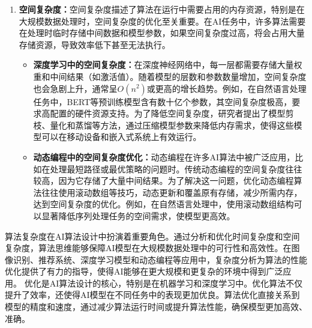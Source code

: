 \begin{enumerate}
\begin{itemize}
\item {\bf 推荐系统中的时间复杂度：}推荐系统在处理用户和商品数据的海量组合时，常面临计算复杂度的挑战。
例如，协同过滤算法在传统情况下计算复杂度较高，需要遍历大量数据。随着数据量增大，计算的时间复杂度可能达到$O(n^2)$或更高，使得推荐系统的实时计算难以实现。为此，一些优化方法，如矩阵分解和基于图的推荐算法，在复杂度控制上做出了优化，使得算法可以在大型电商平台和社交媒体中提供实时推荐。
\item {\bf 大规模搜索算法：}搜索问题是经典的AI任务，比如导航系统的路径规划。传统的广度优先搜索（BFS）和深度优先搜索（DFS）在复杂度上表现不佳。A*算法通过结合启发式搜索，在计算复杂度上得到了显著提升，确保算法能够在较短时间内完成最优路径的搜索。A*算法应用于无人驾驶和地图导航中，使其能够快速找到从当前位置到目标的最优路径。
\end{itemize}
\item {\bf 空间复杂度：}空间复杂度描述了算法在运行中需要占用的内存资源，特别是在大规模数据处理时，空间复杂度的优化至关重要。在AI任务中，许多算法需要在处理时临时存储中间数据和模型参数，如果空间复杂度过高，将会占用大量存储资源，导致效率低下甚至无法执行。
\begin{itemize}
\item {\bf 深度学习中的空间复杂度：}在深度神经网络中，每一层都需要存储大量权重和中间结果（如激活值）。随着模型的层数和参数数量增加，空间复杂度也会急剧上升，通常呈$O(n^2)$或更高的增长趋势。例如，在自然语言处理任务中，BERT等预训练模型含有数十亿个参数，其空间复杂度极高，要求高配置的硬件资源支持。为了降低空间复杂度，研究者提出了模型剪枝、量化和蒸馏等方法，通过压缩模型参数来降低内存需求，使得这些模型可以在移动设备和嵌入式系统上有效运行。
\item {\bf 动态编程中的空间复杂度优化：}动态编程在许多AI算法中被广泛应用，比如在处理最短路径或最优策略的问题时。传统动态编程的空间复杂度往往较高，因为它存储了大量中间结果。为了解决这一问题，优化动态编程算法往往使用滚动数组等技巧，动态更新和覆盖原有存储，减少所需内存，达到空间复杂度的优化。例如，在自然语言处理中，使用滚动数组结构可以显著降低序列处理任务的空间需求，使模型更高效。

\end{itemize}
\end{enumerate}
算法复杂度在AI算法设计中扮演着重要角色。通过分析和优化时间复杂度和空间复杂度，算法思维能够保障AI模型在大规模数据处理中的可行性和高效性。在图像识别、推荐系统、深度学习模型和动态编程等应用中，复杂度分析为算法的性能优化提供了有力的指导，使得AI能够在更大规模和更复杂的环境中得到广泛应用。
优化是AI算法设计的核心，特别是在机器学习和深度学习中。优化算法不仅提升了效率，还使得AI模型在不同任务中的表现更加优良。算法优化直接关系到模型的精度和速度，通过减少算法运行时间或提升算法性能，确保模型更加高效、准确。
